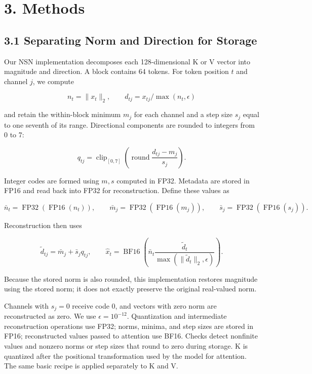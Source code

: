 \documentclass[10pt,a4paper]{article}
\begin{document}
\section{3. Methods}\label{methods}

\subsection{3.1 Separating Norm and Direction for Storage}\label{separating-norm-and-direction-for-storage}

Our NSN implementation decomposes each 128-dimensional K or V vector into magnitude and direction. A block contains 64 tokens. For token position \(t\) and channel \(j\), we compute

\[
 n_t=\lVert x_t\rVert_2,\qquad d_{tj}=x_{tj}/\max(n_t,\epsilon)
\]

and retain the within-block minimum \(m_j\) for each channel and a step size \(s_j\) equal to one seventh of its range. Directional components are rounded to integers from 0 to 7:

\[
 q_{tj}=\operatorname{clip}_{[0,7]}\!\left(\operatorname{round}\frac{d_{tj}-m_j}{s_j}\right).
\]

Integer codes are formed using \(m,s\) computed in FP32. Metadata are stored in FP16 and read back into FP32 for reconstruction. Define these values as

\[
 \bar n_t=\operatorname{FP32}(\operatorname{FP16}(n_t)),\qquad
 \bar m_j=\operatorname{FP32}(\operatorname{FP16}(m_j)),\qquad
 \bar s_j=\operatorname{FP32}(\operatorname{FP16}(s_j)).
\]

Reconstruction then uses

\[
 \widetilde d_{tj}=\bar m_j+\bar s_jq_{tj},\qquad
 \widehat x_t=\operatorname{BF16}\!\left(
 \bar n_t\frac{\widetilde d_t}{\max(\lVert\widetilde d_t\rVert_2,\epsilon)}\right).
\]

Because the stored norm is also rounded, this implementation restores magnitude using the stored norm; it does not exactly preserve the original real-valued norm.

Channels with \(s_j=0\) receive code 0, and vectors with zero norm are reconstructed as zero. We use \(\epsilon=10^{-12}\). Quantization and intermediate reconstruction operations use FP32; norms, minima, and step sizes are stored in FP16; reconstructed values passed to attention use BF16. Checks detect nonfinite values and nonzero norms or step sizes that round to zero during storage. K is quantized after the positional transformation used by the model for attention. The same basic recipe is applied separately to K and V.
\end{document}
